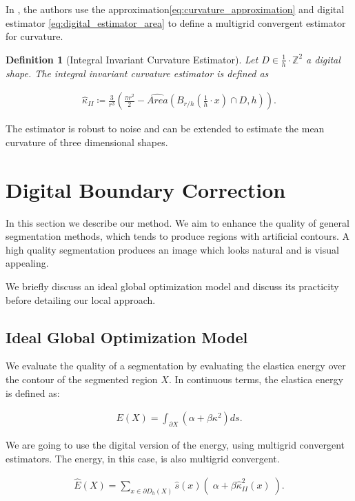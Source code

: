 \documentclass[runningheads]{llncs}
\newtheorem{ddef}{Definition}
\begin{document}
	In \cite{coeurjolly13}, the authors use the approximation\eqref{eq:curvature_approximation} and digital estimator \eqref{eq:digital_estimator_area} to define a multigrid convergent estimator for curvature.

	\begin{ddef}[Integral Invariant Curvature Estimator]
		Let $D \in \frac{1}{h} \cdot \mathbb{Z}^2$ a digital shape. The integral invariant curvature estimator is defined as
		
		\begin{align*}
			\hat{\kappa}_{II} \coloneqq \frac{3}{r^3} \left( \frac{\pi r^2}{2} - \widehat{Area} \left( B_{r/h} ( \frac{1}{h} \cdot x ) \cap D, h \right) \right).
		\end{align*}
	\end{ddef}
	

	The estimator is robust to noise and can be extended to estimate the mean curvature of three dimensional shapes.
	

\section{Digital Boundary Correction}

In this section we describe our method. We aim to enhance the quality of general segmentation methods, which tends to produce regions with artificial contours. A high quality segmentation produces an image which looks natural and is visual appealing. 

We briefly discuss an ideal global optimization model and discuss its practicity before detailing our local approach.


\subsection{Ideal Global Optimization Model}

We evaluate the quality of a segmentation by evaluating the elastica energy over the contour of the segmented region $X$. In continuous terms, the elastica energy is defined as:

\begin{align*}
	E(X) = \int_{\partial X}{(\alpha + \beta \kappa^2) ds}.
\end{align*}

We are going to use the digital version of the energy, using multigrid convergent estimators. The energy, in this case, is also multigrid convergent.

\begin{align}
	\hat{E}(X) = \sum_{x \in \partial D_h(X)}{ \hat{s}(x)\left(\; \alpha + \beta \hat{\kappa}_{II}^2(x) \; \right)}.  
	\label{eq:digital-energy}
\end{align}
\end{document}
